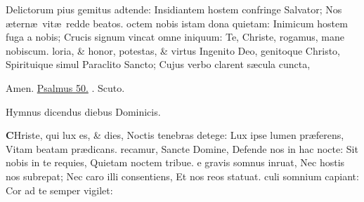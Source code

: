 \documentclass[letter,11pt]{book}
\makeatletter
\DeclareRobustCommand{\Vbar}{\vers@resp{-0.1em}{V}}
\newcommand{\vers@resp@sym}{\raisebox{0.2ex}{\rotatebox[origin=c]{-20}{$\m@th\rceil$}}}
\newcommand{\vers@resp}[2]{%
  {\ooalign{\hidewidth\kern#1\vers@resp@sym\hidewidth\cr#2\cr}}%
}%
\def\V{\color{Red} \Vbar . \color{black}}
\makeatother
\begin{document}
\begin{multicols*}{2}
\newline \indent Delictorum pius gemitus adtende:
\newline \indent Insidiantem hostem confringe Salvator;
\newline \indent Nos \ae tern\ae \ vit\ae \ redde beatos.
octem nobis istam dona quietam:
\newline \indent Inimicum hostem fuga a nobis;
\newline \indent Crucis signum vincat omne iniquum:
\newline \indent Te, Christe, rogamus, mane nobiscum.
loria, \& honor, potestas, \& virtus
\newline \indent Ingenito Deo, genitoque Christo,
\newline \indent Spirituique simul Paraclito Sancto;
\newline \indent Cujus verbo clarent s\ae cula cuncta,
\par Amen.
\newline \color{Red} \hyperlink{ps50}{Psalmus 50.} \color{black} \V Scuto.
\vspace{-.5em} \begin{center} \color{Red} Hymnus dicendus diebus Dominicis. \end{center} \vspace{-.5em}
\lettrine[lines=2]{\bfseries \color{Red} C}{}Hriste, qui lux es, \& dies,
\newline Noctis tenebras detege:
\newline \indent Lux ipse lumen pr\ae ferens,
\newline \indent Vitam beatam pr\ae dicans.
recamur, Sancte Domine,
\newline \indent Defende nos in hac nocte:
\newline \indent Sit nobis in te requies,
\newline \indent Quietam noctem tribue.
e gravis somnus inruat,
\newline \indent Nec hostis nos subrepat;
\newline \indent Nec caro illi consentiens,
\newline \indent Et nos reos statuat.
culi somnium capiant:
\newline \indent Cor ad te semper vigilet:

\end{multicols*}
\end{document}
